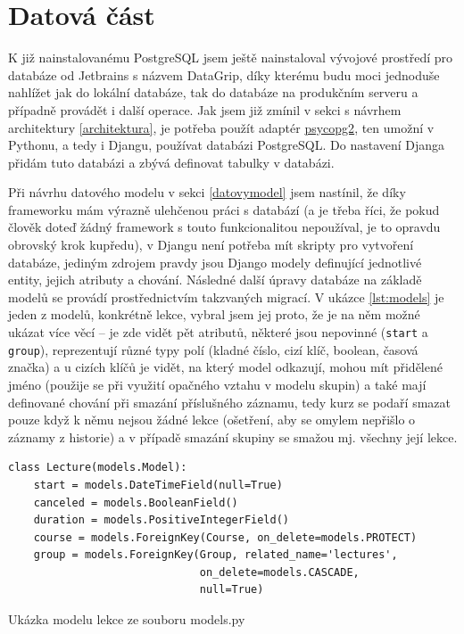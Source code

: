     \section{Datová část}\label{sec:datovaCast}
    K již nainstalovanému PostgreSQL jsem ještě nainstaloval vývojové prostředí pro databáze od Jetbrains s názvem DataGrip, díky kterému budu moci jednoduše nahlížet jak do lokální databáze, tak do databáze na produkčním serveru a případně provádět i další operace. Jak jsem již zmínil v sekci s návrhem architektury \ref{architektura}, je potřeba použít adaptér \href{http://initd.org/psycopg/}{psycopg2}, ten umožní v Pythonu, a tedy i Djangu, používat databázi PostgreSQL. Do nastavení Djanga přidám tuto databázi a zbývá definovat tabulky v databázi.
    
    Při návrhu datového modelu v sekci \ref{datovymodel} jsem nastínil, že díky frameworku mám výrazně ulehčenou práci s databází (a je třeba říci, že pokud člověk doteď žádný framework s touto funkcionalitou nepoužíval, je to opravdu obrovský krok kupředu), v Djangu není potřeba mít skripty pro vytvoření databáze, jediným zdrojem pravdy jsou Django modely definující jednotlivé entity, jejich atributy a chování. Následné další úpravy databáze na základě modelů se provádí prostřednictvím takzvaných migrací. V ukázce \ref{lst:models} je jeden z modelů, konkrétně lekce, vybral jsem jej proto, že je na něm možné ukázat více věcí -- je zde vidět pět atributů, některé jsou nepovinné (\verb|start| a \verb|group|), reprezentují různé typy polí (kladné číslo, cizí klíč, boolean, časová značka) a u cizích klíčů je vidět, na který model odkazují, mohou mít přidělené jméno (použije se při využití opačného vztahu v modelu skupin) a také mají definované chování při smazání příslušného záznamu, tedy kurz se podaří smazat pouze když k němu nejsou žádné lekce (ošetření, aby se omylem nepřišlo o záznamy z historie) a v případě smazání skupiny se smažou mj. všechny její lekce.
    
    \begin{listing}[ht]
    	\begin{verbatim}
class Lecture(models.Model):
    start = models.DateTimeField(null=True)
    canceled = models.BooleanField()
    duration = models.PositiveIntegerField()
    course = models.ForeignKey(Course, on_delete=models.PROTECT)
    group = models.ForeignKey(Group, related_name='lectures',
                              on_delete=models.CASCADE,
                              null=True)
    	\end{verbatim}
    	\caption{Ukázka modelu lekce ze souboru models.py}\label{lst:models}
    \end{listing}
    
